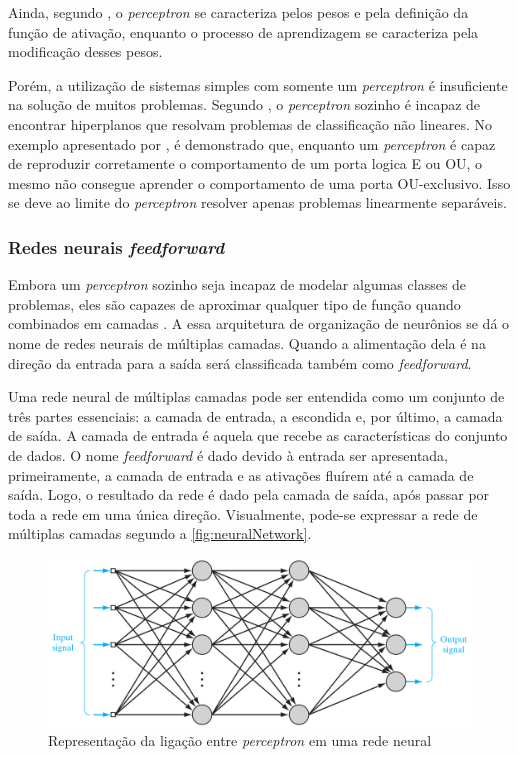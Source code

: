 \documentclass[
    12pt,
    oneside,
    a4paper,
    english,
    brazil
]{abntex2}
\begin{document}
Ainda, segundo , o  \textit{perceptron} se caracteriza pelos
pesos  e  pela  definição  da  função  de  ativação,  enquanto  o  processo  de
aprendizagem se caracteriza pela modificação desses pesos.

Porém, a  utilização de sistemas  simples com somente um  \textit{perceptron} é
insuficiente  na  solução  de muitos  problemas.  Segundo  ,
o  \textit{perceptron}   sozinho  é   incapaz  de  encontrar   hiperplanos  que
resolvam problemas  de classificação não  lineares. No exemplo  apresentado por
, é demonstrado que, enquanto um \textit{perceptron} é capaz
de reproduzir corretamente o comportamento de um  porta logica E ou OU, o mesmo
não  consegue aprender  o  comportamento  de uma  porta  OU-exclusivo. Isso  se
deve  ao limite  do \textit{perceptron}  resolver apenas  problemas linearmente
separáveis.

\subsubsection{Redes neurais \textit{feedforward}}

Embora um \textit{perceptron}  sozinho seja incapaz de  modelar algumas classes
de problemas,  eles são  capazes de  aproximar qualquer  tipo de  função quando
combinados em camadas . A essa arquitetura de organização de
neurônios  se  dá o  nome  de  redes neurais  de  múltiplas  camadas. Quando  a
alimentação dela é na direção da  entrada para a saída será classificada também
como \textit{feedforward}.

Uma rede  neural de múltiplas  camadas pode ser  entendida como um  conjunto de
três  partes essenciais:  a camada  de entrada,  a escondida  e, por  último, a
camada de saída. A camada de entrada  é aquela que recebe as características do
conjunto de  dados. O  nome \textit{feedforward}  é dado  devido à  entrada ser
apresentada, primeiramente,  a camada de entrada  e as ativações fluírem  até a
camada de saída.  Logo, o resultado da  rede é dado pela camada  de saída, após
passar por toda  a rede em uma única direção.  Visualmente, pode-se expressar a
rede de múltiplas camadas segundo a \autoref{fig:neuralNetwork}.

\begin{figure}[ht]
    \centering
    \caption{Representação da ligação entre \textit{perceptron} em uma rede
    neural}\label{fig:neuralNetwork}
    \includegraphics[width=.5\linewidth]{images/neuralNetwork.png}
\end{figure}
\end{document}
